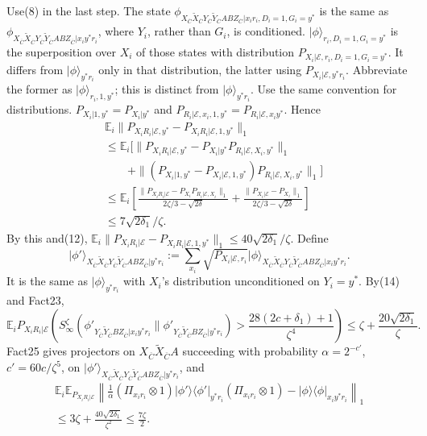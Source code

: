 \documentclass[10pt,a4paper]{article}
\providecommand{\ket}[1]{\lvert#1\rangle}
\providecommand{\bra}[1]{\langle#1\rvert}
\providecommand{\proj}[1]{\ket{#1}\bra{#1}}
\providecommand{\QAliceRest}{X_{\overline C}\widetilde X_{\overline C}A}
\providecommand{\QBobRest}{Y_{\overline C}\widetilde Y_{\overline C}BZ_{\overline C}}
\providecommand{\QAllRest}{X_{\overline C}\widetilde X_{\overline C}Y_{\overline C}\widetilde Y_{\overline C}ABZ_{\overline C}}
\begin{document}
Use(8) in the last step. The state $\phi_{\QAllRest|x_ir_i,D_i=1,G_i=y^*}$ is the same as $\phi_{\QAllRest|x_iy^*r_i}$, where $Y_i$, rather than $G_i$, is conditioned. $\ket\phi_{r_i,D_i=1,G_i=y^*}$ is the superposition over $X_i$ of those states with distribution $P_{X_i|\mathcal E,r_i,D_i=1,G_i=y^*}$. It differs from $\ket\phi_{y^*r_i}$ only in that distribution, the latter using $P_{X_i|\mathcal E,y^*r_i}$. Abbreviate the former as $\ket\phi_{r_i,1,y^*}$; this is distinct from $\ket\phi_{y^*r_i}$. Use the same convention for distributions.
$P_{X_i|1,y^*}=P_{X_i|y^*}$ and $P_{R_i|\mathcal E,x_i,1,y^*}=P_{R_i|\mathcal E,x_iy^*}$. Hence
\begin{align*}&\mathbb E_i\|P_{X_iR_i|\mathcal E,y^*}-P_{X_iR_i|\mathcal E,1,y^*}\|_1\\&\le\mathbb E_i[\|P_{X_iR_i|\mathcal E,y^*}-P_{X_i|y^*}P_{R_i|\mathcal E,X_i,y^*}\|_1\\&\qquad+\|(P_{X_i|1,y^*}-P_{X_i|\mathcal E,1,y^*})P_{R_i|\mathcal E,X_i,y^*}\|_1]\\&\le\mathbb E_i\left[\frac{\|P_{X_iR_i|\mathcal E}-P_{X_i}P_{R_i|\mathcal E,X_i}\|_1}{2\zeta/3-\sqrt{2\delta}}+\frac{\|P_{X_i|\mathcal E}-P_{X_i}\|_1}{2\zeta/3-\sqrt{2\delta}}\right]\\&\le7\sqrt{2\delta_1}/\zeta.
\end{align*}
By this and(12), $\mathbb E_i\|P_{X_iR_i|\mathcal E}-P_{X_iR_i|\mathcal E,1,y^*}\|_1\le40\sqrt{2\delta_1}/\zeta$.
Define
\[\ket{\phi'}_{\QAllRest|y^*r_i}:=\sum_{x_i}\sqrt{P_{X_i|\mathcal E,r_i}}\ket\phi_{\QAllRest|x_iy^*r_i}.\]
It is the same as $\ket\phi_{y^*r_i}$ with $X_i$'s distribution unconditioned on $Y_i=y^*$. By(14) and Fact23,
\[\mathbb E_iP_{X_iR_i|\mathcal E}\left(S_\infty^\zeta(\phi'_{\QBobRest|x_iy^*r_i}\|\phi'_{\QBobRest|y^*r_i})>\frac{28(2c+\delta_1)+1}{\zeta^4}\right)\le\zeta+\frac{20\sqrt{2\delta_1}}\zeta.\]
Fact25 gives projectors on $\QAliceRest$ succeeding with probability $\alpha=2^{-c'}$, $c'=60c/\zeta^5$, on $\ket{\phi'}_{\QAllRest|y^*r_i}$, and
\begin{multline*}\mathbb E_i\mathbb E_{P_{X_iR_i|\mathcal E}}\left\|\frac1\alpha(\Pi_{x_ir_i}\otimes1)\proj{\phi'}_{y^*r_i}(\Pi_{x_ir_i}\otimes1)-\proj\phi_{x_iy^*r_i}\right\|_1\\\le3\zeta+\frac{40\sqrt{2\delta_1}}{\zeta^2}\le\frac{7\zeta}2.\tag{15}\end{multline*}
\end{document}
